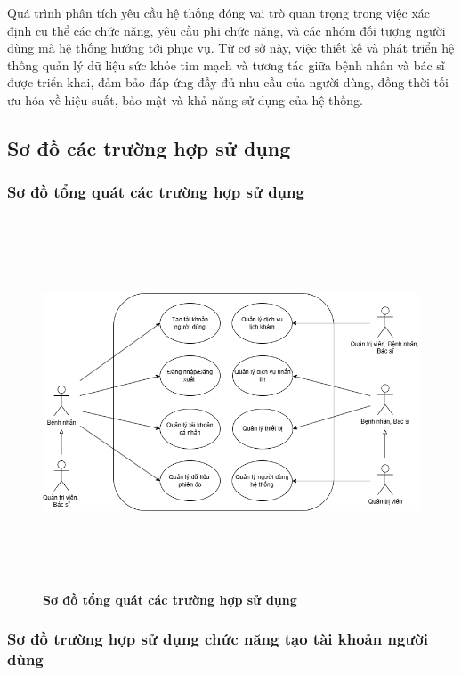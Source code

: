 Quá trình phân tích yêu cầu hệ thống đóng vai trò quan trọng trong việc xác định cụ thể các chức năng, yêu cầu phi chức năng, và các nhóm đối tượng người dùng mà hệ thống hướng tới phục vụ.
Từ cơ sở này, việc thiết kế và phát triển hệ thống quản lý dữ liệu sức khỏe tim mạch và tương tác giữa bệnh nhân và bác sĩ được triển khai, đảm bảo đáp ứng đầy đủ nhu cầu của người dùng,
đồng thời tối ưu hóa về hiệu suất, bảo mật và khả năng sử dụng của hệ thống.

\subsection{Sơ đồ các trường hợp sử dụng}

\subsubsection{Sơ đồ tổng quát các trường hợp sử dụng}

\begin{figure}[H]
	\centering
	\includegraphics[width=16cm,height=11cm]{Images/use_case/use_case_general.png}
	\caption[Sơ đồ tổng quát các trường hợp sử dụng của hệ thống]{\bfseries \fontsize{12pt}{0pt}
		\selectfont Sơ đồ tổng quát các trường hợp sử dụng}
	\label{use_case_general} %
\end{figure}

\subsubsection{Sơ đồ trường hợp sử dụng chức năng tạo tài khoản người dùng}

